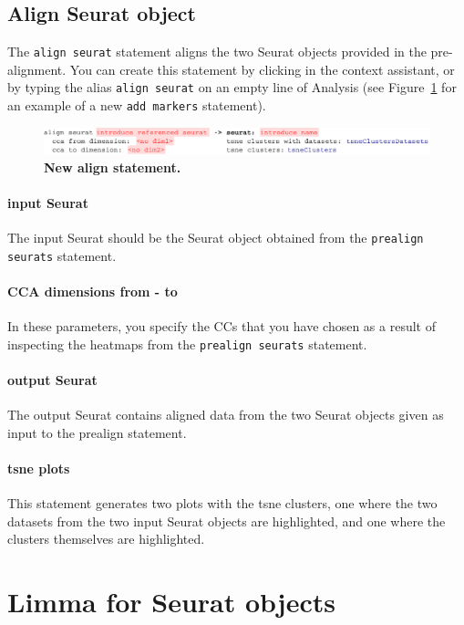 \subsection{Align Seurat object}
The \texttt{align seurat} statement aligns the two Seurat objects provided in the pre-alignment.
You can create this statement by clicking
 in the context assistant, or by typing
the alias \texttt{align seurat} on an empty line of Analysis (see Figure~\ref{fig:AlignSeurat}
for an example of a new \texttt{add markers} statement).

\begin{figure}[h!tbp]
  \centering
    \includegraphics[width=\figWidthWide]{figures/AlignSeurat.pdf}
    \caption[New align statement.]{\textbf{New align statement.}}
\label{fig:AlignSeurat}
\end{figure}

\paragraph{input Seurat} The input Seurat should be the Seurat object obtained from the
\texttt{prealign seurats} statement.

\paragraph{CCA dimensions from - to} In these parameters, you specify the CCs that you have
chosen as a result of inspecting the heatmaps from the \texttt{prealign seurats} statement.

\paragraph{output Seurat} The output Seurat contains aligned data from the two Seurat objects
given as input to the prealign statement.

\paragraph{tsne plots} This statement generates two plots with the tsne clusters, one where
the two datasets from the two input Seurat objects are highlighted, and one where the clusters
themselves are highlighted.

\section{Limma for Seurat objects}\label{sec:LimmaSeurat}
